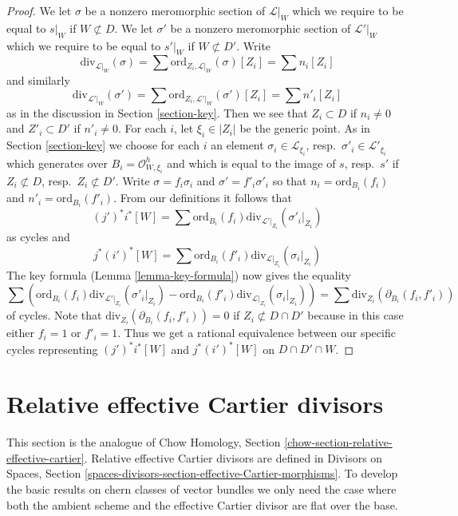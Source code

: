\begin{proof}
\medskip\noindent
We let $\sigma$ be a nonzero meromorphic section of $\mathcal{L}|_W$
which we require to be equal to $s|_W$ if $W \not \subset D$.
We let $\sigma'$ be a nonzero meromorphic section of $\mathcal{L}'|_W$
which we require to be equal to $s'|_W$ if $W \not \subset D'$.
Write
$$
\text{div}_{\mathcal{L}|_W}(\sigma) =
\sum \text{ord}_{Z_i, \mathcal{L}|_W}(\sigma)[Z_i] = \sum n_i[Z_i]
$$
and similarly
$$
\text{div}_{\mathcal{L}'|_W}(\sigma') =
\sum \text{ord}_{Z_i, \mathcal{L}'|_W}(\sigma')[Z_i] = \sum n'_i[Z_i]
$$
as in the discussion in Section \ref{section-key}.
Then we see that $Z_i \subset D$ if $n_i \not = 0$ and
$Z'_i \subset D'$ if $n'_i \not = 0$. For each $i$, let $\xi_i \in |Z_i|$
be the generic point. As in Section \ref{section-key} we choose
for each $i$ an element
$\sigma_i \in \mathcal{L}_{\xi_i}$, resp.\ $\sigma'_i \in \mathcal{L}'_{\xi_i}$
which generates over $B_i = \mathcal{O}_{W, \xi_i}^h$
and which is equal to the image of
$s$, resp.\ $s'$ if $Z_i \not \subset D$, resp.\ $Z_i \not \subset D'$.
Write $\sigma = f_i \sigma_i$ and $\sigma' = f'_i\sigma'_i$ so that
$n_i = \text{ord}_{B_i}(f_i)$ and
$n'_i = \text{ord}_{B_i}(f'_i)$.
From our definitions it follows that
$$
(j')^*i^*[W] =
\sum \text{ord}_{B_i}(f_i) \text{div}_{\mathcal{L}'|_{Z_i}}(\sigma'_i|_{Z_i})
$$
as cycles and
$$
j^*(i')^*[W] =
\sum \text{ord}_{B_i}(f'_i) \text{div}_{\mathcal{L}|_{Z_i}}(\sigma_i|_{Z_i})
$$
The key formula (Lemma \ref{lemma-key-formula}) now gives the equality
$$
\sum \left(
\text{ord}_{B_i}(f_i) \text{div}_{\mathcal{L}'|_{Z_i}}(\sigma'_i|_{Z_i}) -
\text{ord}_{B_i}(f'_i) \text{div}_{\mathcal{L}|_{Z_i}}(\sigma_i|_{Z_i})
\right) =
\sum \text{div}_{Z_i}(\partial_{B_i}(f_i, f'_i))
$$
of cycles. Note that $\text{div}_{Z_i}(\partial_{B_i}(f_i, f'_i)) = 0$ if
$Z_i \not \subset D \cap D'$ because in this case either $f_i = 1$
or $f'_i = 1$. Thus we get a rational equivalence between our specific
cycles representing $(j')^*i^*[W]$ and $j^*(i')^*[W]$ on $D \cap D' \cap W$.
\end{proof}










\section{Relative effective Cartier divisors}
\label{section-relative-effective-cartier}

\noindent
This section is the analogue of
Chow Homology, Section \ref{chow-section-relative-effective-cartier}.
Relative effective Cartier divisors are defined
in Divisors on Spaces, Section
\ref{spaces-divisors-section-effective-Cartier-morphisms}.
To develop the basic results on chern classes of vector bundles
we only need the case where both the ambient scheme and the effective
Cartier divisor are flat over the base.

